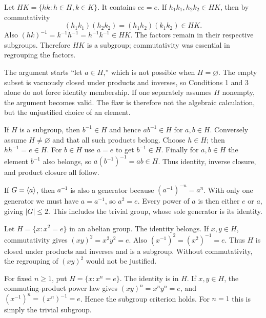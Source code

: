 
Let $HK=\{hk:h\in H,k\in K\}$. It contains $ee=e$. If $h_1k_1,h_2k_2\in HK$, then by commutativity
\[(h_1k_1)(h_2k_2)=(h_1h_2)(k_1k_2)\in HK.
\]
Also $(hk)^{-1}=k^{-1}h^{-1}=h^{-1}k^{-1}\in HK$. The factors remain in their respective subgroups. Therefore $HK$ is a subgroup; commutativity was essential in regrouping the factors.


The argument starts ``let $a\in H$,'' which is not possible when $H=\varnothing$. The empty subset is vacuously closed under products and inverses, so Conditions 1 and 3 alone do not force identity membership. If one separately assumes $H$ nonempty, the argument becomes valid. The flaw is therefore not the algebraic calculation, but the unjustified choice of an element.


If $H$ is a subgroup, then $b^{-1}\in H$ and hence $ab^{-1}\in H$ for $a,b\in H$. Conversely assume $H\ne\varnothing$ and that all such products belong. Choose $h\in H$; then $hh^{-1}=e\in H$. For $b\in H$ use $a=e$ to get $b^{-1}\in H$. Finally for $a,b\in H$ the element $b^{-1}$ also belongs, so $a(b^{-1})^{-1}=ab\in H$. Thus identity, inverse closure, and product closure all follow.


If $G=\langle a\rangle$, then $a^{-1}$ is also a generator because $(a^{-1})^{-n}=a^n$. With only one generator we must have $a=a^{-1}$, so $a^2=e$. Every power of $a$ is then either $e$ or $a$, giving $|G|\le2$. This includes the trivial group, whose sole generator is its identity.


Let $H=\{x:x^2=e\}$ in an abelian group. The identity belongs. If $x,y\in H$, commutativity gives $(xy)^2=x^2y^2=e$. Also $(x^{-1})^2=(x^2)^{-1}=e$. Thus $H$ is closed under products and inverses and is a subgroup. Without commutativity, the regrouping of $(xy)^2$ would not be justified.


For fixed $n\ge1$, put $H=\{x:x^n=e\}$. The identity is in $H$. If $x,y\in H$, the commuting-product power law gives $(xy)^n=x^ny^n=e$, and $(x^{-1})^n=(x^n)^{-1}=e$. Hence the subgroup criterion holds. For $n=1$ this is simply the trivial subgroup.

